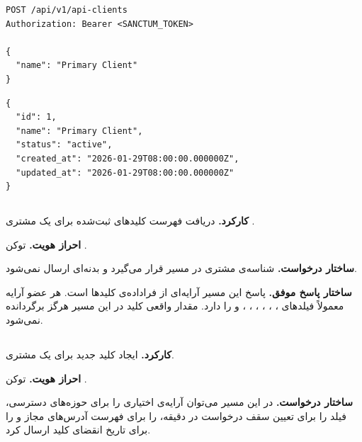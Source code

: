 \begin{latin}
\begin{lstlisting}[style=jsonStyle]
POST /api/v1/api-clients
Authorization: Bearer <SANCTUM_TOKEN>

{
  "name": "Primary Client"
}
\end{lstlisting}
\end{latin}


\begin{latin}
\begin{lstlisting}[style=jsonStyle]
{
  "id": 1,
  "name": "Primary Client",
  "status": "active",
  "created_at": "2026-01-29T08:00:00.000000Z",
  "updated_at": "2026-01-29T08:00:00.000000Z"
}
\end{lstlisting}
\end{latin}


\subsection{}
\textbf{کارکرد.} دریافت فهرست کلیدهای ثبت‌شده برای یک مشتری .

\textbf{احراز هویت.} توکن .

\textbf{ساختار درخواست.} شناسه‌ی مشتری در مسیر قرار می‌گیرد و بدنه‌ای
ارسال نمی‌شود.

\textbf{ساختار پاسخ موفق.} پاسخ این مسیر آرایه‌ای از فراداده‌ی کلیدها است.
هر عضو آرایه معمولاً فیلدهای ، ،
، ، ،
،  و  را دارد.
مقدار واقعی کلید در این مسیر هرگز برگردانده نمی‌شود.

\subsection{}
\textbf{کارکرد.} ایجاد کلید  جدید برای یک مشتری.

\textbf{احراز هویت.} توکن .

\textbf{ساختار درخواست.} در این مسیر می‌توان آرایه‌ی اختیاری
 را برای حوزه‌های دسترسی، فیلد
 را برای تعیین سقف درخواست در دقیقه،
 را برای فهرست آدرس‌های مجاز و  را
برای تاریخ انقضای کلید ارسال کرد.

